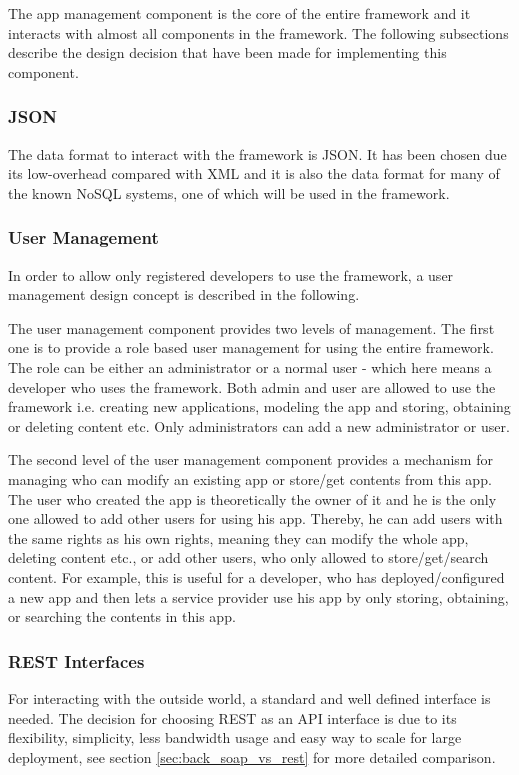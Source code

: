 The app management component is the core of the entire framework and it interacts with almost all components in the framework. The following subsections describe the design decision that have been made for implementing this component.

\subsubsection{JSON}
The data format to interact with the framework is \ac{JSON}. It has been chosen due its low-overhead compared with \ac{XML} and it is also the data format for many of the known \ac{NoSQL} systems, one of which will be used in the framework.
 
\subsubsection{User Management \label{sec:des_user_man}}
In order to allow only registered developers to use the framework, a user management design concept is described in the following.

The user management component provides two levels of management. The first one is to provide a role based user management for using the entire framework. The role can be either an administrator or a normal user - which here means a developer who uses the framework. Both admin and user are allowed to use the framework i.e. creating new applications, modeling the app and storing, obtaining or deleting content etc. Only administrators can add a new administrator or user.

The second level of the user management component provides a mechanism for managing who can modify an existing app or store/get contents from this app. The user who created the app is theoretically the owner of it and he is the only one allowed to add other users for using his app. Thereby, he can add users with the same rights as his own rights, meaning they can modify the whole app, deleting content etc., or add other users, who only allowed to store/get/search content. For example, this is useful for a developer, who has deployed/configured a new app and then lets a service provider use his app by only storing, obtaining,  or searching the contents in this app. 

\subsubsection{REST Interfaces \label{sec:des_rest_api}} For interacting with the outside world, a standard and well defined interface is needed. The decision for choosing \ac{REST} as an \ac{API} interface is due to its flexibility, simplicity, less bandwidth usage and easy way to scale for large deployment, see section \ref{sec:back_soap_vs_rest} for more detailed comparison.


